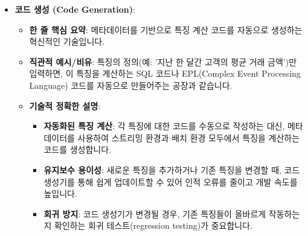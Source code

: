 \documentclass[11pt,a4paper]{article}
\theoremstyle{definition}
\begin{document}
\begin{itemize}
\begin{itemize}
\begin{itemize}
\begin{itemize}
\begin{itemize}
    \item \textbf{코드 생성 (Code Generation)}:
    \begin{itemize}
        \item \textbf{한 줄 핵심 요약}: 메타데이터를 기반으로 특징 계산 코드를 자동으로 생성하는 혁신적인 기술입니다.
        \item \textbf{직관적 예시/비유}: 특징의 정의(예: '지난 한 달간 고객의 평균 거래 금액')만 입력하면, 이 특징을 계산하는 SQL 코드나 EPL(Complex Event Processing Language) 코드를 자동으로 만들어주는 공장과 같습니다.
        \item \textbf{기술적 정확한 설명}:
        \begin{itemize}
            \item \textbf{자동화된 특징 계산}: 각 특징에 대한 코드를 수동으로 작성하는 대신, 메타데이터를 사용하여 스트리밍 환경과 배치 환경 모두에서 특징을 계산하는 코드를 생성합니다.
            \item \textbf{유지보수 용이성}: 새로운 특징을 추가하거나 기존 특징을 변경할 때, 코드 생성기를 통해 쉽게 업데이트할 수 있어 인적 오류를 줄이고 개발 속도를 높입니다.
            \item \textbf{회귀 방지}: 코드 생성기가 변경될 경우, 기존 특징들이 올바르게 작동하는지 확인하는 회귀 테스트(regression testing)가 중요합니다.
        \end{itemize}
    \end{itemize}


\end{itemize}
\end{itemize}
\end{itemize}
\end{itemize}
\end{itemize}
\end{document}
